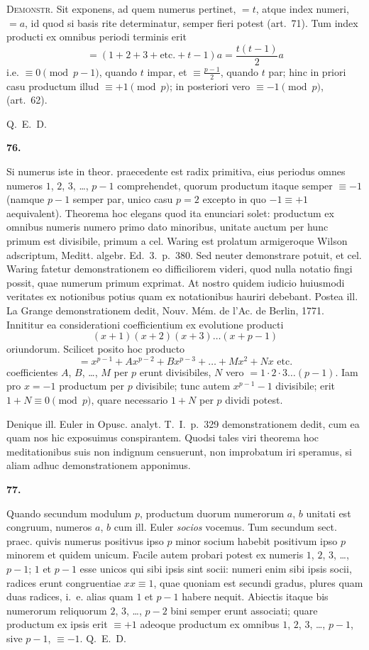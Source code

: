 \documentclass[12pt,a4paper]{article}
\theoremstyle{plain}
\theoremstyle{definition}
\theoremstyle{remark}
\begin{document}
\textsc{Demonstr.} Sit exponens, ad quem numerus pertinet, $=t$, atque index numeri, $=a$, id quod si basis rite determinatur, semper fieri potest (art.~71). Tum index producti ex omnibus periodi terminis erit
\[= (1+2+3+\text{etc.}+t-1)a = \frac{t(t-1)}{2} a\]
i.e. $\equiv 0 \pmod{p-1}$, quando $t$ impar, et $\equiv \frac{p-1}{2}$, quando $t$ par; hinc in priori casu productum illud $\equiv +1 \pmod{p}$; in posteriori vero $\equiv -1 \pmod{p}$, (art.~62).

Q.~E.~D.

\setcounter{satz}{76}
\addtocounter{satz}{-1}
\textbf{76.}

Si numerus iste in theor. praecedente est radix primitiva, eius periodus omnes numeros $1$, $2$, $3$, \ldots, $p-1$ comprehendet, quorum productum itaque semper $\equiv -1$ (namque $p-1$ semper par, unico casu $p=2$ excepto in quo $-1 \equiv +1$ aequivalent). Theorema hoc elegans quod ita enunciari solet: productum ex omnibus numeris numero primo dato minoribus, unitate auctum per hunc primum est divisibile, primum a cel. Waring est prolatum armigeroque Wilson adscriptum, Meditt. algebr. Ed.~3.~p.~380. Sed neuter demonstrare potuit, et cel. Waring fatetur demonstrationem eo difficiliorem videri, quod nulla notatio fingi possit, quae numerum primum exprimat. At nostro quidem iudicio huiusmodi veritates ex notionibus potius quam ex notationibus hauriri debebant. Postea ill. La Grange demonstrationem dedit, Nouv. Mém. de l'Ac. de Berlin, 1771. Innititur ea considerationi coefficientium ex evolutione producti
\[(x+1)(x+2)(x+3)\ldots(x+p-1)\]
oriundorum. Scilicet posito hoc producto
\[= x^{p-1} + Ax^{p-2} + Bx^{p-3} + \ldots + Mx^2 + Nx \text{ etc.}\]
coefficientes $A$, $B$, \ldots, $M$ per $p$ erunt divisibiles, $N$ vero $=1 \cdot 2 \cdot 3 \ldots (p-1)$. Iam pro $x=-1$ productum per $p$ divisibile; tunc autem $x^{p-1}-1$ divisibile; erit $1+N \equiv 0 \pmod{p}$, quare necessario $1+N$ per $p$ dividi potest.

Denique ill. Euler in Opusc. analyt. T.~I.~p.~329 demonstrationem dedit, cum ea quam nos hic exposuimus conspirantem. Quodsi tales viri theorema hoc meditationibus suis non indignum censuerunt, non improbatum iri speramus, si aliam adhuc demonstrationem apponimus.

\setcounter{satz}{77}
\addtocounter{satz}{-1}
\textbf{77.}

Quando secundum modulum $p$, productum duorum numerorum $a$, $b$ unitati est congruum, numeros $a$, $b$ cum ill. Euler \emph{socios} vocemus. Tum secundum sect. praec. quivis numerus positivus ipso $p$ minor socium habebit positivum ipso $p$ minorem et quidem unicum. Facile autem probari potest ex numeris $1$, $2$, $3$, \ldots, $p-1$; $1$ et $p-1$ esse unicos qui sibi ipsis sint socii: numeri enim sibi ipsis socii, radices erunt congruentiae $xx \equiv 1$, quae quoniam est secundi gradus, plures quam duas radices, i.~e. alias quam $1$ et $p-1$ habere nequit. Abiectis itaque bis numerorum reliquorum $2$, $3$, \ldots, $p-2$ bini semper erunt associati; quare productum ex ipsis erit $\equiv +1$ adeoque productum ex omnibus $1$, $2$, $3$, \ldots, $p-1$, sive $p-1$, $\equiv -1$. Q.~E.~D.
\end{document}
